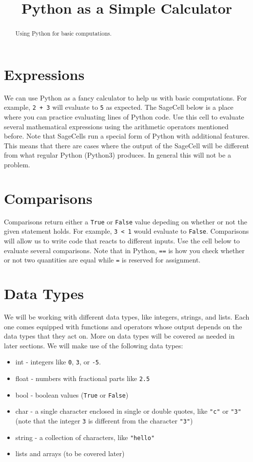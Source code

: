 \documentclass{ximera}
\title{Python as a Simple Calculator}
\begin{document}
  
\begin{abstract}  
Using Python for basic computations.
\end{abstract}  
\maketitle

\section{Expressions}

We can use Python as a fancy calculator to help us with basic computations. For example, \verb|2 + 3| will evaluate to \verb|5| as expected. The SageCell below is a place where you can practice evaluating lines of Python code. Use this cell to evaluate several mathematical expressions using the arithmetic operators mentioned before. Note that SageCells run a special form of Python with additional features. This means that there are cases where the output of the SageCell will be different from what regular Python (Python3) produces. In general this will not be a problem.

\section{Comparisons}

Comparisons return either a \verb|True| or \verb|False| value depeding on whether or not the given statement holds. For example, \verb|3 < 1| would evaluate to \verb|False|. Comparisons will allow us to write code that reacts to different inputs. Use the cell below to evaluate several comparisons. Note that in Python, \verb|==| is how you check whether or not two quantities are equal while \verb|=| is reserved for assignment.

\section{Data Types}

We will be working with different data types, like integers, strings, and lists. Each one comes equipped with functions and operators whose output depends on the data types that they act on. More on data types will be covered as needed in later sections. We will make use of the following data types:

\begin{itemize}
	\item int - integers like \verb|0|, \verb|3|, or \verb|-5|.
	\item float - numbers with fractional parts like \verb|2.5|
	\item bool - boolean values (\verb|True| or \verb|False|)
	\item char - a single character enclosed in single or double quotes, like \verb|"c"| or \verb|"3"| (note that the integer \verb|3| is different from the character \verb|"3"|)
	\item string - a collection of characters, like \verb|"hello"|
	\item lists and arrays (to be covered later)
\end{itemize}
\end{document}
